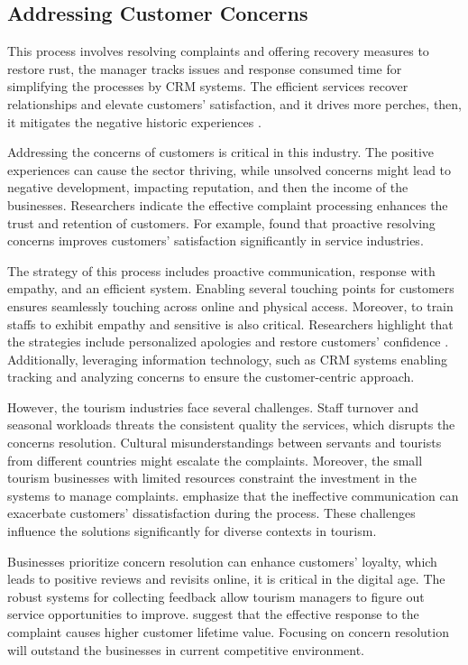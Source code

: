\subsection{Addressing Customer Concerns}
This process involves resolving complaints and offering recovery measures to restore rust, the manager tracks issues and response consumed time for simplifying the processes by CRM systems. The efficient services recover relationships and elevate customers' satisfaction, and it drives more perches, then, it mitigates the negative historic experiences \cite{TrebickaTartaraj2023ServiceRecovery}.

Addressing the concerns of customers is critical in this industry. The positive experiences can cause the sector thriving, while unsolved concerns might lead to negative development, impacting reputation, and then the income of the businesses. Researchers indicate the effective complaint processing enhances the trust and retention of customers. For example, \cite{HomburgFurstKoschate2010ComplaintHandling} found that proactive resolving concerns improves customers' satisfaction significantly in service industries. 

The strategy of this process includes proactive communication, response with empathy, and an efficient system. Enabling several touching points for customers ensures seamlessly touching across online and physical access. Moreover, to train staffs to exhibit empathy and sensitive is also critical. Researchers highlight that the strategies include personalized apologies and restore customers' confidence \cite{KimKimKim2014PerceivedJustice}. Additionally, leveraging information technology, such as CRM systems enabling tracking and analyzing concerns to ensure the customer-centric approach.

However, the tourism industries face several challenges. Staff turnover and seasonal workloads threats the consistent quality the services, which disrupts the concerns resolution. Cultural misunderstandings between servants and tourists from different countries might escalate the complaints. Moreover, the small tourism businesses with limited resources constraint the investment in the systems to manage complaints. \cite{ChangKhanTsai2012CustomerComplaints} emphasize that the ineffective communication can exacerbate customers' dissatisfaction during the process. These challenges influence the solutions significantly for diverse contexts in tourism.

Businesses prioritize concern resolution can enhance customers' loyalty, which leads to positive reviews and revisits online, it is critical in the digital age. The robust systems for collecting feedback allow tourism managers to figure out service opportunities to improve. \cite{LiuZhangKeh2017ComplaintManagement} suggest that the effective response to the complaint causes higher customer lifetime value. Focusing on concern resolution will outstand the businesses in current competitive environment.

